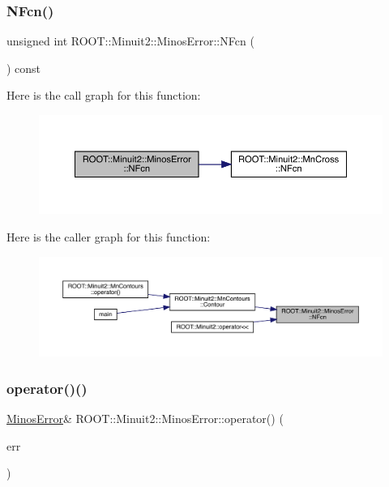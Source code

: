 \subsubsection{\texorpdfstring{NFcn()}{NFcn()}\hspace{0.1cm}{\footnotesize\ttfamily [2/2]}}
{\footnotesize\ttfamily unsigned int R\+O\+O\+T\+::\+Minuit2\+::\+Minos\+Error\+::\+N\+Fcn (\begin{DoxyParamCaption}{ }\end{DoxyParamCaption}) const\hspace{0.3cm}{\ttfamily [inline]}}

Here is the call graph for this function\+:
\nopagebreak
\begin{figure}[H]
\begin{center}
\leavevmode
\includegraphics[width=350pt]{d2/dd1/classROOT_1_1Minuit2_1_1MinosError_a4956b01f7899f42847617c378e5c86c2_cgraph}
\end{center}
\end{figure}
Here is the caller graph for this function\+:\nopagebreak
\begin{figure}[H]
\begin{center}
\leavevmode
\includegraphics[width=350pt]{d2/dd1/classROOT_1_1Minuit2_1_1MinosError_a4956b01f7899f42847617c378e5c86c2_icgraph}
\end{center}
\end{figure}
\mbox{\label{classROOT_1_1Minuit2_1_1MinosError_ac45b7f3397fe4c13e1811b486e10602a}} 
\subsubsection{\texorpdfstring{operator()()}{operator()()}\hspace{0.1cm}{\footnotesize\ttfamily [1/4]}}
{\footnotesize\ttfamily \mbox{\hyperlink{classROOT_1_1Minuit2_1_1MinosError}{Minos\+Error}}\& R\+O\+O\+T\+::\+Minuit2\+::\+Minos\+Error\+::operator() (\begin{DoxyParamCaption}\item[{const \mbox{\hyperlink{classROOT_1_1Minuit2_1_1MinosError}{Minos\+Error}} \&}]{err }\end{DoxyParamCaption})\hspace{0.3cm}{\ttfamily [inline]}}

